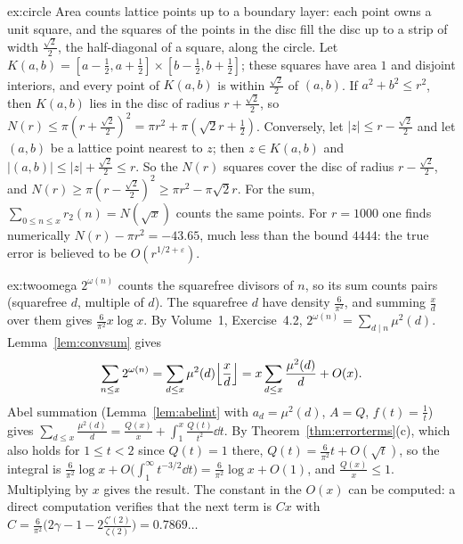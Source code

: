 \begin{solution}{ex:circle}
\idea Area counts lattice points up to a boundary layer: each point owns a unit square, and the squares of the points in the disc fill the
disc up to a strip of width $\frac{\sqrt2}2$, the half-diagonal of a square, along the circle.
\writeup Let $K(a,b)=[a-\frac12,a+\frac12]\times[b-\frac12,b+\frac12]$; these squares have area $1$ and disjoint interiors, and every point of $K(a,b)$ is within
$\frac{\sqrt2}2$ of $(a,b)$. If $a^2+b^2\le r^2$, then $K(a,b)$ lies in the disc of radius $r+\frac{\sqrt2}2$, so $N(r)\le\pi(r+\frac{\sqrt2}2)^2=\pi r^2+\pi(\sqrt2r+\frac12)$.
Conversely, let $|z|\le r-\frac{\sqrt2}2$ and let $(a,b)$ be a lattice point nearest to $z$; then $z\in K(a,b)$ and $|(a,b)|\le|z|+\frac{\sqrt2}2\le r$. So the $N(r)$
squares cover the disc of radius $r-\frac{\sqrt2}2$, and $N(r)\ge\pi(r-\frac{\sqrt2}2)^2\ge\pi r^2-\pi\sqrt2r$. For the sum, $\sum_{0\le n\le x}r_2(n)=N(\sqrt x)$ counts
the same points. For $r=1000$ one finds numerically $N(r)-\pi r^2=-43.65$, much less than the bound $4444$: the true error is believed to be
$O(r^{1/2+\varepsilon})$.
\end{solution}

\begin{solution}{ex:twoomega}
\idea $2^{\omega(n)}$ counts the squarefree divisors of $n$, so its sum counts pairs (squarefree $d$, multiple of $d$). The squarefree $d$ have
density $\frac6{\pi^2}$, and summing $\frac xd$ over them gives $\frac6{\pi^2}x\log x$.
\writeup By Volume~1, Exercise~4.2, $2^{\omega(n)}=\sum_{d\mid n}\mu^2(d)$. Lemma~\ref{lem:convsum} gives
\[
\sum_{n\le x}2^{\omega(n)}=\sum_{d\le x}\mu^2(d)\Bigl\lfloor\frac xd\Bigr\rfloor=x\sum_{d\le x}\frac{\mu^2(d)}d+O(x).
\]
Abel summation (Lemma~\ref{lem:abelint} with $a_d=\mu^2(d)$, $A=Q$, $f(t)=\frac1t$) gives $\sum_{d\le x}\frac{\mu^2(d)}d=\frac{Q(x)}x+\int_1^x\frac{Q(t)}{t^2}\dd t$. By
Theorem~\ref{thm:errorterms}(c), which also holds for $1\le t<2$ since $Q(t)=1$ there, $Q(t)=\frac6{\pi^2}t+O(\sqrt t)$, so the integral is
$\frac6{\pi^2}\log x+O\bigl(\int_1^\infty t^{-3/2}\dd t\bigr)=\frac6{\pi^2}\log x+O(1)$, and $\frac{Q(x)}x\le1$. Multiplying by $x$ gives the result. The constant
in the $O(x)$ can be computed: a direct computation verifies that the next term is $Cx$ with $C=\frac6{\pi^2}\bigl(2\gamma-1-2\frac{\zeta'(2)}{\zeta(2)}\bigr)=0.7869\ldots$
\end{solution}

